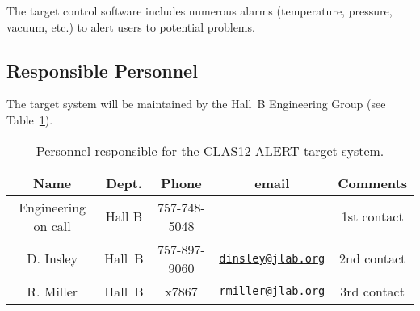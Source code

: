 The target control software includes numerous alarms (temperature, pressure, vacuum, etc.) to alert users
to potential problems.

\subsection{Responsible Personnel}

The target system will be maintained by the Hall~B Engineering Group (see Table~\ref{tb:target}).  

\begin{table}[!htb]
\centering
\begin{tabular}{|c|c|c|c|c|}
\hline
Name & Dept. & Phone & email & Comments \\ \hline
Engineering on call & Hall B & 757-748-5048 & & 1st contact \\ \hline
D. Insley & Hall~B  &757-897-9060&\href{mailto:dinsley@jlab.org}{\nolinkurl{dinsley@jlab.org}} & 2nd contact \\ \hline
R. Miller & Hall~B  & x7867      &\href{mailto:rmiller@jlab.org}{\nolinkurl{rmiller@jlab.org}} & 3rd contact \\ \hline
\end{tabular}
\caption{Personnel responsible for the CLAS12 ALERT target system.} 
\label{tb:target}
\end{table}
